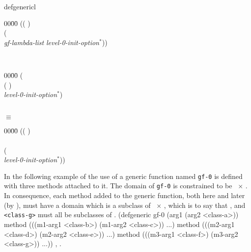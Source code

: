 \begin{optDefinition}
\begin{RewriteTable}{defgeneric}{l}
\begin{minipage}[t]{\linewidth}
\begin{tabbing}
        00\=00\= \kill
        (( ) \identifier\\
        \>( \\
        \>\> {\em gf-lambda-list} {\em level-0-init-option$^*$}))
    \end{tabbing}
\end{minipage}\\
%
\begin{minipage}[t]{\linewidth}
    \begin{tabbing}
        00\=00\= \kill
        ( \\
        \>( \identifier) \\
         {\em level-0-init-option$^*$})
    \end{tabbing}
\end{minipage}\\
\hspace{2cm}$\equiv$
\begin{minipage}[t]{\linewidth}
    \begin{tabbing}
        00\=00\= \kill
        (( )\\
        \>\identifier\\
        \>( \\
        \> {\em level-0-init-option$^*$}))
    \end{tabbing}
\end{minipage}
\end{RewriteTable}
%
\examples
In the following example of the use of  a generic
function named {\tt gf-0} is defined with three methods attached to
it.  The domain of {\tt gf-0} is constrained to be \
$\times$ {\tt <class-a>}.  In consequence, each method added to the
generic function, both here and later (by \macroref{defmethod}), must have
a domain which is a subclass of \classref{object}\ $\times$ {\tt <class-a>},
which is to say that {\tt <class-c>}, {\tt <class-e>} and {\tt
<class-g>} must all be subclasses of {\tt <class-a>}.
%
{\syntax
(defgeneric gf-0 (arg1 (arg2 <class-a>))
  method (((m1-arg1 <class-b>) (m1-arg2 <class-c>)) ...)
  method (((m2-arg1 <class-d>) (m2-arg2 <class-e>)) ...)
  method (((m3-arg1 <class-f>) (m3-arg2 <class-g>)) ...))
\endsyntax}
%
\seealso%
, .


\end{optDefinition}
